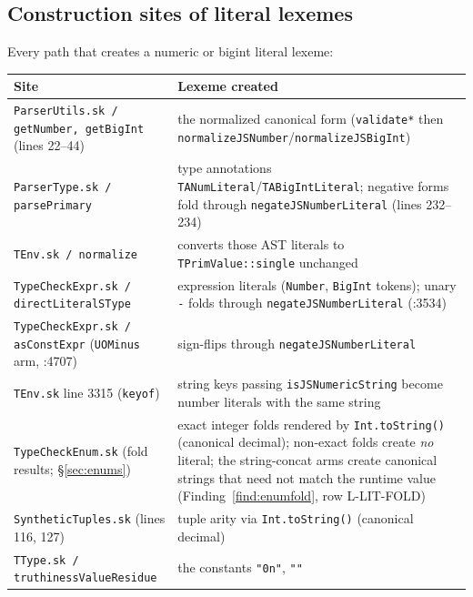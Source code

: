\documentclass[11pt]{article}
\begin{document}
\subsection{Construction sites of literal lexemes}
\label{sec:sites}

Every path that creates a numeric or bigint literal lexeme:

\begin{center}
\small
\renewcommand{\arraystretch}{1.2}
\begin{tabular}{@{}p{5.6cm}p{7.6cm}@{}}
\toprule
\textbf{Site} & \textbf{Lexeme created} \\
\midrule
\texttt{ParserUtils.sk / getNumber, getBigInt} (lines 22--44) &
  the normalized canonical form (\texttt{validate*} then
  \texttt{normalizeJSNumber}/\texttt{normalizeJSBigInt}) \\
\texttt{ParserType.sk / parsePrimary} &
  type annotations \texttt{TANumLiteral}/\texttt{TABigIntLiteral};
  negative forms fold through \texttt{negateJSNumberLiteral}
  (lines 232--234) \\
\texttt{TEnv.sk / normalize} &
  converts those AST literals to \texttt{TPrimValue::single} unchanged \\
\texttt{TypeCheckExpr.sk / directLiteralSType} &
  expression literals (\texttt{Number}, \texttt{BigInt} tokens); unary
  \texttt{-} folds through \texttt{negateJSNumberLiteral} (:3534) \\
\texttt{TypeCheckExpr.sk / asConstExpr} (\texttt{UOMinus} arm, :4707) &
  sign-flips through \texttt{negateJSNumberLiteral} \\
\texttt{TEnv.sk} line 3315 (\texttt{keyof}) &
  string keys passing \texttt{isJSNumericString} become number literals
  with the same string \\
\texttt{TypeCheckEnum.sk} (fold results; \S\ref{sec:enums}) &
  exact integer folds rendered by \texttt{Int.toString()} (canonical
  decimal); non-exact folds create \emph{no} literal; the string-concat
  arms create canonical strings that need not match the runtime value
  (Finding~\ref{find:enumfold}, row L-LIT-FOLD) \\
\texttt{SyntheticTuples.sk} (lines 116, 127) &
  tuple arity via \texttt{Int.toString()} (canonical decimal) \\
\texttt{TType.sk / truthinessValueResidue} &
  the constants \texttt{"0n"}, \texttt{""} \\
\bottomrule
\end{tabular}
\end{center}
\end{document}

